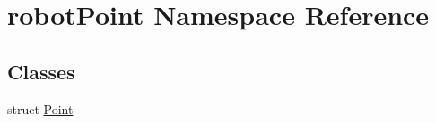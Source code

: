 \hypertarget{namespacerobot_point}{}\section{robot\+Point Namespace Reference}
\label{namespacerobot_point}
\subsection*{Classes}
\begin{DoxyCompactItemize}
\item 
struct \hyperlink{structrobot_point_1_1_point}{Point}
\end{DoxyCompactItemize}
